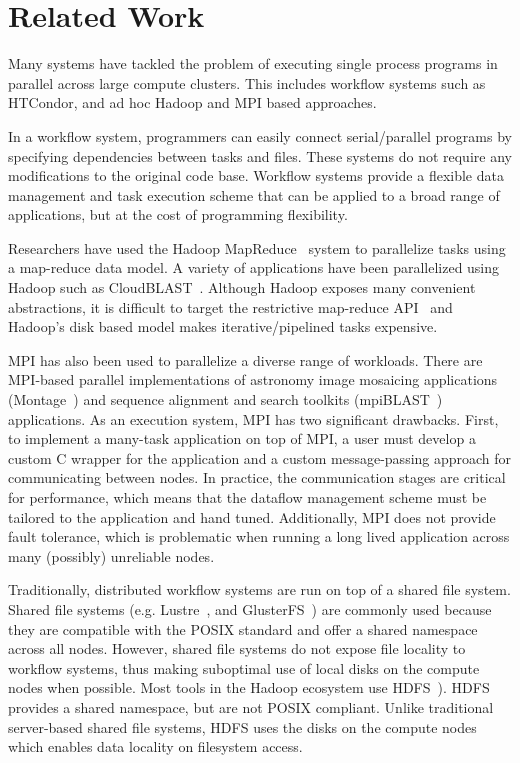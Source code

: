 \documentclass[10pt, conference, compsocconf]{IEEEtran}
\begin{document}
\section{Related Work}
\label{sec:Related}

Many systems have tackled the problem of executing single process programs in parallel
across large compute clusters. This includes workflow systems such as HTCondor,
and ad hoc Hadoop and MPI based approaches.

In a workflow system, programmers can easily connect serial/parallel programs by specifying
dependencies between tasks and files. These systems do not require any modifications to
the original code base. Workflow systems provide a flexible data management and task execution
scheme that can be applied to a broad range of applications, but at the cost of programming
flexibility.

Researchers have used the Hadoop MapReduce~\cite{HADOOP} system to parallelize
tasks using a map-reduce data model. A variety of applications have been parallelized
using Hadoop such as CloudBLAST~\cite{matsunaga08}. 
 Although Hadoop exposes many convenient
abstractions, it is difficult to target the restrictive map-reduce API~\cite{dewitt08}
and Hadoop's disk based model makes iterative/pipelined tasks expensive.

MPI has also been used to parallelize a diverse range of workloads. There
are MPI-based parallel implementations of astronomy image
mosaicing applications (Montage~\cite{jacob09}) and
sequence alignment and search toolkits (mpiBLAST~\cite{lin08}) applications. As an
execution system, MPI has two significant drawbacks. First, to implement a many-task
application on top of MPI, a user must develop a custom C wrapper for the application
and a custom message-passing approach for communicating between nodes. In practice, the
communication stages are critical for performance, which means that the
dataflow management scheme must be tailored to the application and hand tuned. Additionally,
MPI does not provide fault tolerance, which is problematic when running a long lived
application across many (possibly) unreliable nodes.

Traditionally, distributed workflow systems are run on top of a shared file system. 
Shared file systems (e.g. Lustre~\cite{donovan03}, and
GlusterFS~\cite{davies13}) are commonly used because they are compatible with the POSIX
standard and offer a shared namespace across all nodes. However, shared file systems
do not expose file locality to workflow systems, thus making suboptimal use of local
disks on the compute nodes when possible. Most tools in the Hadoop ecosystem use
HDFS~\cite{shvachko10}). HDFS  provides a shared namespace, but are not POSIX
compliant. Unlike traditional server-based shared file systems, HDFS uses
the disks on the compute nodes which enables data locality on filesystem access.
\end{document}
